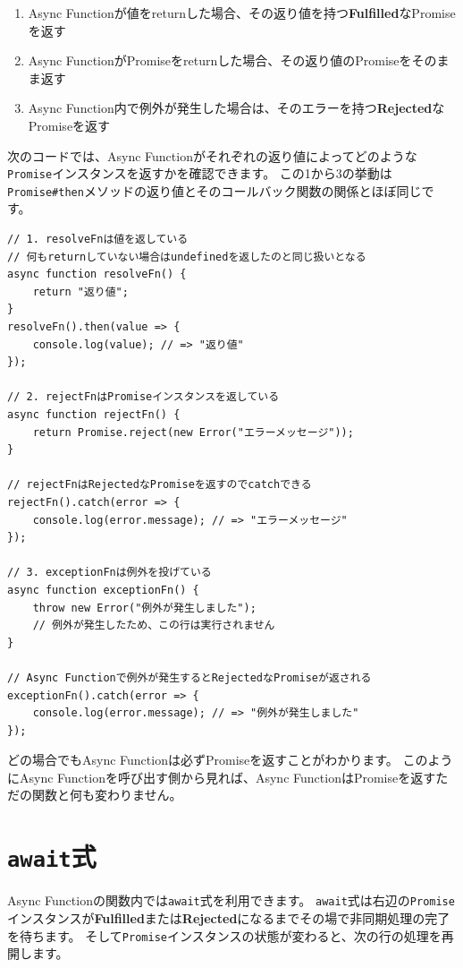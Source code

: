 \begin{enumerate}
\def\labelenumi{\arabic{enumi}.}
\item
  Async
  Functionが値をreturnした場合、その返り値を持つ\textbf{Fulfilled}なPromiseを返す
\item
  Async
  FunctionがPromiseをreturnした場合、その返り値のPromiseをそのまま返す
\item
  Async
  Function内で例外が発生した場合は、そのエラーを持つ\textbf{Rejected}なPromiseを返す
\end{enumerate}

次のコードでは、Async
Functionがそれぞれの返り値によってどのような\texttt{Promise}インスタンスを返すかを確認できます。
この1から3の挙動は\texttt{Promise\#then}メソッドの返り値とそのコールバック関数の関係とほぼ同じです。

\begin{lstlisting}
// 1. resolveFnは値を返している
// 何もreturnしていない場合はundefinedを返したのと同じ扱いとなる
async function resolveFn() {
    return "返り値";
}
resolveFn().then(value => {
    console.log(value); // => "返り値"
});

// 2. rejectFnはPromiseインスタンスを返している
async function rejectFn() {
    return Promise.reject(new Error("エラーメッセージ"));
}

// rejectFnはRejectedなPromiseを返すのでcatchできる
rejectFn().catch(error => {
    console.log(error.message); // => "エラーメッセージ"
});

// 3. exceptionFnは例外を投げている
async function exceptionFn() {
    throw new Error("例外が発生しました");
    // 例外が発生したため、この行は実行されません
}

// Async Functionで例外が発生するとRejectedなPromiseが返される
exceptionFn().catch(error => {
    console.log(error.message); // => "例外が発生しました"
});
\end{lstlisting}

どの場合でもAsync Functionは必ずPromiseを返すことがわかります。
このようにAsync Functionを呼び出す側から見れば、Async
FunctionはPromiseを返すただの関数と何も変わりません。

\hypertarget{await-expression}{%
\section{\texorpdfstring{\texttt{await}式}{await式}}\label{await-expression}}

Async
Functionの関数内では\texttt{await}式を利用できます。
\texttt{await}式は右辺の\texttt{Promise}インスタンスが\textbf{Fulfilled}または\textbf{Rejected}になるまでその場で非同期処理の完了を待ちます。
そして\texttt{Promise}インスタンスの状態が変わると、次の行の処理を再開します。

